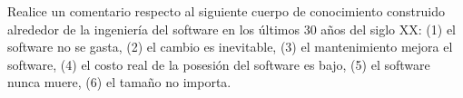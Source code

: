 Realice un comentario respecto al siguiente cuerpo de conocimiento construido alrededor de la ingeniería del software en los últimos 30 años del siglo XX: (1) el software no se gasta, (2) el cambio es inevitable, (3) el mantenimiento mejora el software, (4) el costo real de la posesión del software es bajo, (5) el software nunca muere, (6) el tamaño no importa.
